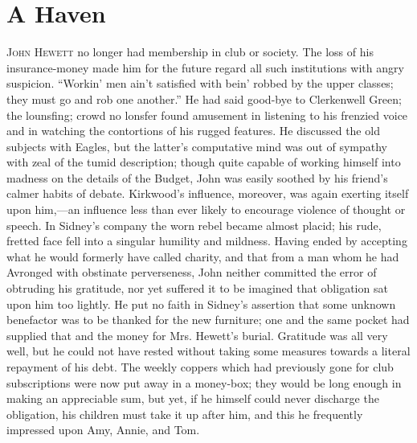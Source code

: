 \chapter{A Haven}

\textsc{John Hewett} no longer had membership in club or society. The
loss of his insurance-money made him for the future regard all such
institutions with angry suspicion. ``Workin' men ain't satisfied with
bein' robbed by the upper classes; they must go and rob one another.''
He had said good-bye to Clerkenwell Green; the lounsfing; crowd no
lonsfer found amusement in listening to his frenzied voice and in
watching the contortions of his rugged features. He discussed the old
subjects with Eagles, but the latter's computative mind was out of
sympathy with zeal of the tumid description; though quite capable of
working himself into madness on the details of the Budget, John was
easily soothed by his friend's calmer habits of debate. Kirkwood's
influence, moreover, was again exerting itself {}upon him,---an
influence less than ever likely to encourage violence of thought or
speech. In Sidney's company the worn rebel became almost placid; his
rude, fretted face fell into a singular humility and mildness. Having
ended by accepting what he would formerly have called charity, and that
from a man whom he had Avronged with obstinate perverseness, John
neither committed the error of obtruding his gratitude, nor yet suffered
it to be imagined that obligation sat upon him too lightly. He put no
faith in Sidney's assertion that some unknown benefactor was to be
thanked for the new furniture; one and the same pocket had supplied that
and the money for Mrs. Hewett's burial. Gratitude was all very well, but
he could not have rested without taking some measures towards a literal
repayment of his debt. The weekly coppers which had previously gone for
club subscriptions were now put away in a money-box; they would be long
enough in making an appreciable sum, but yet, if he himself could never
discharge the obligation, his children must take it up after him, and
this he frequently impressed upon Amy, Annie, and Tom.

